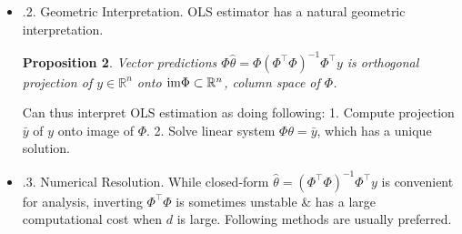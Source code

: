 \documentclass{article}
\newtheorem{proposition}{Proposition}
\begin{document}
\begin{enumerate}
\begin{itemize}
\begin{itemize}
\begin{itemize}
				\begin{proposition}
					When $\Phi$ has full column rank, OLS estimator exists \& is unique, \& is given by $\hat{\theta} = (\Phi^\top\Phi)^{-1}\Phi^\top y$. Denote noncentered\footnote{{\it Centered} covariance matrix would be $\frac{1}{n}\sum_{i=1}^n [\varphi(x_i) - \hat{\mu}][\varphi(x_i) - \hat{\mu}]^\top$, where $\hat{\mu} = \frac{1}{n}\sum_{i=1}^n \varphi(x_i)\in\mathbb{R}^d$ is empirical mean, while consider $\widehat{\Sigma} = \frac{1}{n}\sum_{i=1}^n \varphi(x_i)\varphi(x_i)^\top$.} empirical covariance matrix as $\widehat{\Sigma} = \frac{1}{n}\Phi^\top\Phi\in\mathbb{R}^{d\times d}$; have $\hat{\theta} = \frac{1}{n}\widehat{\Sigma}^{-1}\Phi^\top y$.
				\end{proposition}
				Coercive $=$ going to $\infty$ at $\infty$. Condition $\widehat{\cal R}'(\hat{\theta}) = 0$ gives {\it normal equation} $\Phi^\top\Phi\hat{\theta} = \Phi^\top y$. Multidimensional linear normal equations has a unique solution: $\hat{\theta} = (\Phi^\top\Phi)^{-1}\Phi^\top y$, which shows uniqueness of minimizer of $\widehat{\cal R}$, as well as its closed-form expression. Another way to show uniqueness of minimizer is by showing: $\widehat{\cal R}$ is strongly convex since Hessian $\widehat{\cal R}''(\theta) = 2\widehat{\Sigma}$ is invertible $\forall\theta\in\mathbb{R}^d$ (convexity is studied in Chap. 5). For readers worried about carrying a factor of 2 in gradients, will sue an additional factor $\frac{1}{2}$ in chaps on optimization.
				\item {.2. Geometric Interpretation.} OLS estimator has a natural geometric interpretation.
				
				\begin{proposition}
					Vector predictions $\Phi\hat{\theta} = \Phi(\Phi^\top\Phi)^{-1}\Phi^\top y$ is orthogonal projection of $y\in\mathbb{R}^n$ onto ${\rm im}\Phi\subset\mathbb{R}^n$, column space of $\Phi$.
				\end{proposition}
				Can thus interpret OLS estimation as doing following: 1. Compute projection $\bar{y}$ of $y$ onto image of $\Phi$. 2. Solve linear system $\Phi\theta = \bar{y}$, which has a unique solution.
				\item {.3. Numerical Resolution.} While closed-form $\hat{\theta} = (\Phi^\top\Phi)^{-1}\Phi^\top y$ is convenient for analysis, inverting $\Phi^\top\Phi$ is sometimes unstable \& has a large computational cost when $d$ is large. Following methods are usually preferred.
				

\end{itemize}
\end{itemize}
\end{itemize}
\end{enumerate}
\end{document}
